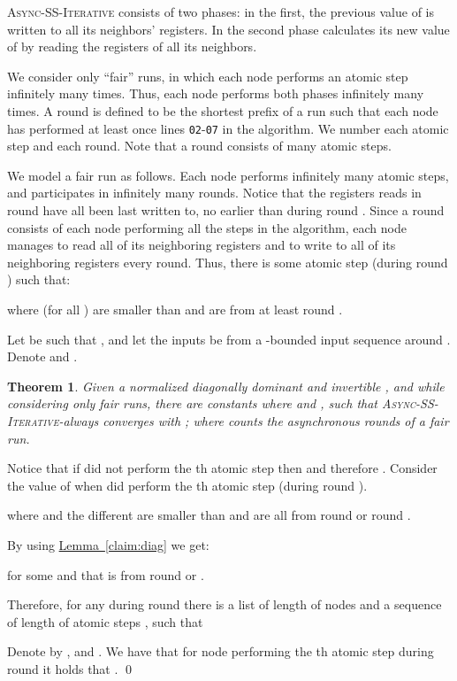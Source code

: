 \documentclass[preprint,12pt]{elsarticle}
\newtheorem{theorem}{Theorem}
\newenvironment{proof}{\noindent{\bf Proof:~~}}{}
\newcommand{\namedref}[2]{\hyperref[#2]{#1~\ref*{#2}}}
\newcommand{\lemmaref}[1]{\namedref{Lemma}{#1}}
\newcommand{\asyncAlg}{\textsc{Async-SS-Iterative}\xspace}
\newcommand{\linenumber}[1]{{\tt #1}}
\begin{document}
\asyncAlg consists of two phases: in the first, the previous value of  is
written to all its neighbors' registers. In the second phase  calculates
its new value of  by reading the registers of all its
neighbors.

We consider only ``fair'' runs, in which each node performs an
atomic step infinitely many times. Thus, each node performs both
phases infinitely many times. A round is defined to be the shortest
prefix of a run such that each node has performed at least once lines \linenumber{02}-\linenumber{07} in the
algorithm. We number each atomic step and each round. Note that a round consists of many
atomic steps.

We model a fair run as follows. Each node  performs
infinitely many atomic steps, and participates in infinitely many
rounds. Notice that the registers  reads in round  have
all been last written to, no earlier than during round . Since a
round consists of each node performing all the steps in the
algorithm, each node  manages to read all of its neighboring
registers and to write to all of its neighboring registers every
round. Thus, there is some atomic step  (during round )
such that:

where  (for all ) are smaller
than  and are from at least round .

Let  be such that , and let the inputs be
from a -bounded input sequence around . Denote  and .

\begin{theorem}\label{theorem:main2}
  Given a normalized diagonally dominant and invertible , and while considering only fair runs,
  there are constants  where  and ,
  such that \asyncAlg -always converges with
  ; where  counts the asynchronous rounds of a fair run.
\end{theorem}

\begin{proof}
 Notice that if  did not perform the
th atomic step then  and therefore
. Consider the value of
 when  did perform the th atomic step
(during round ).

where  and the different  are smaller than  and are
all from round  or round .

By using \lemmaref{claim:diag} we get:

for some  and  that is from round  or
.

Therefore, for any  during round  there is a list of
length  of nodes  and a
sequence of length  of atomic steps , such that



Denote by , and . We have
that for node  performing the th atomic step during round
 it holds that .
\qed\end{proof}
\end{document}
